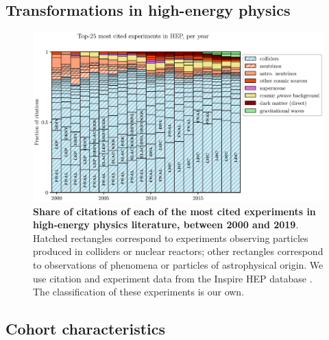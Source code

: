 \documentclass{article}
\begin{document}
\subsection{\label{appendix:landscape}Transformations in high-energy physics}

\begin{figure}[H]
    \centering
    \includegraphics[width=\textwidth]{Fig8.eps}
    \caption{\textbf{Share of citations of each of the most cited experiments in high-energy physics literature, between 2000 and 2019}. Hatched rectangles correspond to experiments observing particles produced in colliders or nuclear reactors; other rectangles correspond to observations of phenomena or particles of astrophysical origin. We use citation and experiment data from the Inspire HEP database \citep{InspireAPI}. The classification of these experiments is our own. }
    \label{fig:experiments}
\end{figure}


\subsection{\label{appendix:sample_characteristics}Cohort characteristics}
\end{document}

